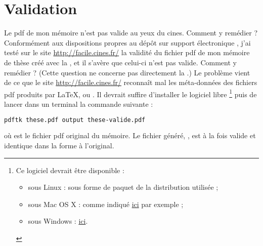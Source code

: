 \section{Validation}
\label{sec:validation}

\begin{dbfaq}{Le \acrshort{pdf} de mon mémoire n'est pas valide au yeux du
    \acrshort{cines}. Comment y remédier ?}{}
  Conformément aux dispositions propres au dépôt sur support électronique
  \autocite{guidoct-abes}, j'ai testé sur le site \url{http://facile.cines.fr/}
  la validité du fichier \acrshort{pdf} de mon mémoire de thèse créé avec la
  \yatcl{}, et il s'avère que celui-ci n'est pas valide. Comment y remédier ?
  \tcblower
  (Cette question ne concerne pas directement la \yatcl{}.) Le problème vient de
  ce que le site \url{http://facile.cines.fr/} reconnaît mal les méta-données
  des fichiers \acrshort{pdf} produits par \LaTeX{},  ou
  . Il devrait suffire d'installer le logiciel libre
  \footnote{Ce logiciel devrait être disponible :
    \begin{itemize}
    \item sous Linux : sous forme de paquet de la distribution utilisée ;
    \item sous Mac OS X : comme indiqué
      \href{http://stackoverflow.com/q/20804441}{ici} par exemple ;
    \item sous Windows : \href{https://www.pdflabs.com/tools/pdftk-the-pdf-toolkit/}{ici}.
    \end{itemize}
  }%
  puis de lancer dans un terminal la commande suivante :
\begin{lstlisting}[language=bash]
pdftk these.pdf output these-valide.pdf
\end{lstlisting}
où  est le fichier \acrshort{pdf} original du mémoire. Le
fichier généré, , est à la fois valide et identique dans
la forme à l'original.
\end{dbfaq}

%
\iffalse
\fi
